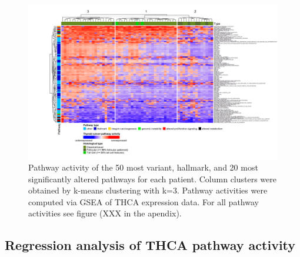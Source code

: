 \documentclass[
]{article}
\begin{document}
\begin{figure}

{\centering \includegraphics[width=1\linewidth]{figures/THCA GSEA Heatmap fertig top 50} 

}

\caption{Pathway activity of the 50 most variant, hallmark, and 20 most significantly altered pathways for each patient. Column clusters were obtained by k-means clustering with k=3. Pathway activities were computed via GSEA of THCA expression data. For all pathway activities see figure (XXX in the apendix).}\label{fig:THCAhmGSEA}
\end{figure}

\hypertarget{regression-analysis-of-thca-pathway-activity}{%
\subsection{Regression analysis of THCA pathway
activity}\label{regression-analysis-of-thca-pathway-activity}}
\end{document}
